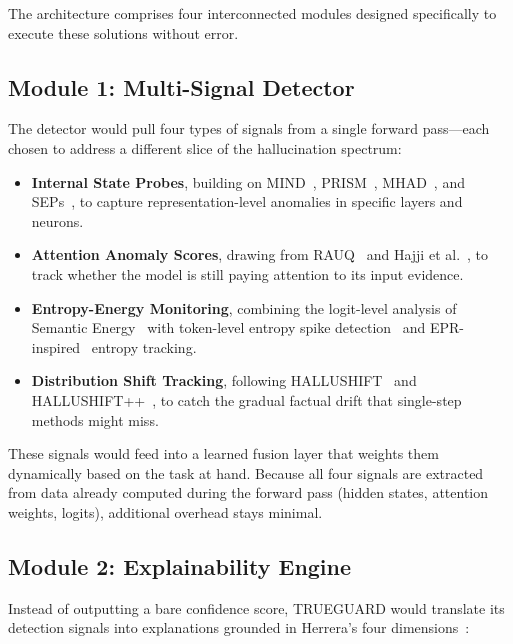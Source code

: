 \documentclass[journal]{IEEEtran}
\begin{document}
The architecture comprises four interconnected modules designed specifically to execute these solutions without error.

\subsection{Module 1: Multi-Signal Detector}

The detector would pull four types of signals from a single forward pass---each chosen to address a different slice of the hallucination spectrum:

\begin{itemize}
\item \textbf{Internal State Probes}, building on MIND~\cite{mind}, PRISM~\cite{prism}, MHAD~\cite{mhad}, and SEPs~\cite{sep}, to capture representation-level anomalies in specific layers and neurons.

\item \textbf{Attention Anomaly Scores}, drawing from RAUQ~\cite{rauq} and Hajji et al.~\cite{map_misbelief}, to track whether the model is still paying attention to its input evidence.

\item \textbf{Entropy-Energy Monitoring}, combining the logit-level analysis of Semantic Energy~\cite{semantic_energy} with token-level entropy spike detection~\cite{entropy_spike} and EPR-inspired~\cite{epr} entropy tracking.

\item \textbf{Distribution Shift Tracking}, following HALLUSHIFT~\cite{hallushift} and HALLUSHIFT++~\cite{hallushift_pp}, to catch the gradual factual drift that single-step methods might miss.
\end{itemize}

These signals would feed into a learned fusion layer that weights them dynamically based on the task at hand. Because all four signals are extracted from data already computed during the forward pass (hidden states, attention weights, logits), additional overhead stays minimal.

\subsection{Module 2: Explainability Engine}

Instead of outputting a bare confidence score, TRUEGUARD would translate its detection signals into explanations grounded in Herrera's four dimensions~\cite{xai_survey}:
\end{document}
